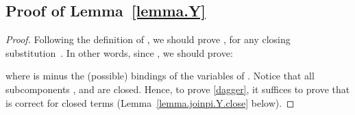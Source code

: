 \documentclass{LMCS}
\newcommand{\forget}[1]{}
\newcommand{\resetequationcounter}{\setcounter{equation}{0}}
\renewcommand{\_}{\mathord{\rule[-.25ex]{1ex}{.15ex}}}
\begin{document}
\subsection{Proof of Lemma~\ref{lemma.Y}}
\label{subsec.prooflemmaY}
\forget{Now we are ready to prove Lemma~\ref{lemma.Y}.}
\resetequationcounter
\begin{proof}
  Following the
  definition of , we should prove , for any closing substitution~.
  In other words, since ,
  we should prove:
  
  where  is  minus the (possible) bindings of the
  variables of .
  Notice that all subcomponents ,  and
   are closed. 
  Hence, to prove
  \eqref{dagger}, it suffices to prove that  is correct for
  closed terms (Lemma~\ref{lemma.joinpi.Y.close} below). \forget{\qed}
\end{proof}
\end{document}
